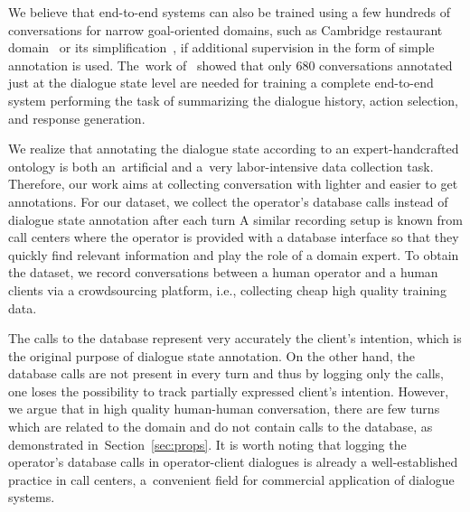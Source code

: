\documentclass[runningheads,a4paper]{llncs}
\def\OD#1{{\color{darkgreen}OD: \it #1}}
\begin{document}
We believe that end-to-end systems can also be trained using a few hundreds of conversations for narrow goal-oriented domains, such as Cambridge restaurant domain~\cite{henderson2014dstc2} or its simplification~\cite{wen2016network}, if additional supervision in the form of simple annotation is used.
The~work of~\cite{wen2016network} showed that only 680 conversations annotated just at the dialogue state level are needed for training a complete end-to-end system performing the task of summarizing the dialogue history, action selection, and response generation.

We realize that annotating the dialogue state according to an expert-handcrafted ontology is both an~artificial and a~very labor-intensive data collection task. 
Therefore, our work aims at collecting conversation with lighter and easier to get annotations.
For our dataset, we collect the operator's database calls instead of dialogue state annotation after each turn
A similar recording setup is known from call centers where the operator is provided with a database interface so that they quickly find relevant information and play the role of a domain expert.
To obtain the dataset, we record conversations between a human operator and a human clients via a crowdsourcing platform, i.e., collecting cheap high quality training data.

The calls to the database represent very accurately the client's intention, which is the original purpose of dialogue state annotation.
On the other hand, the database calls are not present in every turn and thus by logging only the calls, one loses the possibility to track partially expressed client's intention.
However, we argue that in high quality human-human conversation, there are few turns which are related to the domain and do not contain calls to the database, as demonstrated in~Section~\ref{sec:props}.
It is worth noting that logging the operator's database calls in operator-client dialogues is already a well-established practice in call centers, a~convenient field for commercial application of dialogue systems.
\end{document}
